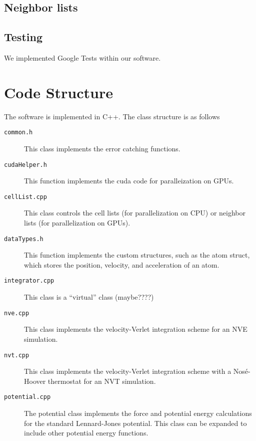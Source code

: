 \documentclass[12pt]{article}
\begin{document}
\subsection{Neighbor lists}

\subsection{Testing}

We implemented Google Tests within our software.

\section{Code Structure}

The software is implemented in C++.
%
The class structure is as follows
\begin{description}

\item[\texttt{common.h}] This class implements the error catching functions.

\item[\texttt{cudaHelper.h}] This function implements the cuda code for paralleization on GPUs.

\item[\texttt{cellList.cpp}] This class controls the cell lists (for parallelization on CPU) or neighbor lists (for parallelization on GPUs). 

\item[\texttt{dataTypes.h}] This function implements the custom structures, such as the atom struct, which stores the position, velocity, and acceleration of an atom.
	
\item[\texttt{integrator.cpp}] This class is a ``virtual'' class (maybe????)

\item[\texttt{nve.cpp}] This class implements the velocity-Verlet integration scheme for an NVE simulation.

\item[\texttt{nvt.cpp}] This class implements the velocity-Verlet integration scheme with a Nos\'{e}-Hoover thermostat for an NVT simulation.

\item[\texttt{potential.cpp}] The potential class implements the force and potential energy calculations for the standard Lennard-Jones potential. 
%
This class can be expanded to include other potential energy functions.


\end{description}
\end{document}
